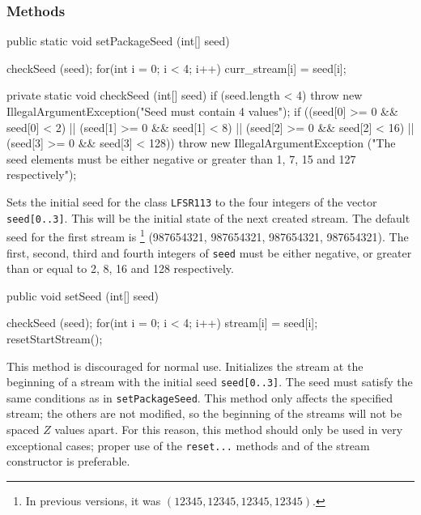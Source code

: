 \subsubsection* {Methods}
\begin{code}
   public static void setPackageSeed (int[] seed) \begin{hide} {
      checkSeed (seed);
      for(int i = 0; i < 4; i++)
         curr_stream[i] = seed[i];
   }

   private static void checkSeed  (int[] seed) {
      if (seed.length < 4)
         throw new IllegalArgumentException("Seed must contain 4 values");
      if ((seed[0] >= 0 && seed[0] < 2)  ||
          (seed[1] >= 0 && seed[1] < 8)  ||
          (seed[2] >= 0 && seed[2] < 16) ||
          (seed[3] >= 0 && seed[3] < 128))
         throw new IllegalArgumentException
         ("The seed elements must be either negative or greater than 1, 7, 15 and 127 respectively");
   }\end{hide}
\end{code}
\begin{tabb} Sets the initial seed for the class \texttt{LFSR113} to the four
  integers of the vector \texttt{seed[0..3]}.
  This will be the initial state of the next created stream.
  The default seed for the first stream is \footnote{In previous
  versions, it was $(12345, 12345, 12345, 12345)$.}
  (987654321, 987654321, 987654321, 987654321).
  The first, second, third and fourth integers of \texttt{seed}
  must be either negative, or greater than or equal to
   2, 8, 16 and 128 respectively.
\end{tabb}
\begin{htmlonly}
\end{htmlonly}
\begin{code}

   public void setSeed (int[] seed) \begin{hide} {
      checkSeed  (seed);
      for(int i = 0; i < 4; i++)
         stream[i] = seed[i];
      resetStartStream();
   } \end{hide}
\end{code}
\begin{tabb} This method is discouraged for normal use.
  Initializes the stream at the beginning of a stream with the initial
  seed \texttt{seed[0..3]}. The seed must satisfy the same conditions
  as in \texttt{setPackageSeed}.
  This method only affects the specified stream; the others are not
  modified, so the beginning of the streams will not be
  spaced $Z$ values apart.
  For this reason, this method should only be used in very
  exceptional cases; proper use of the \texttt{reset...} methods
  and of the stream constructor is preferable.
\end{tabb}

